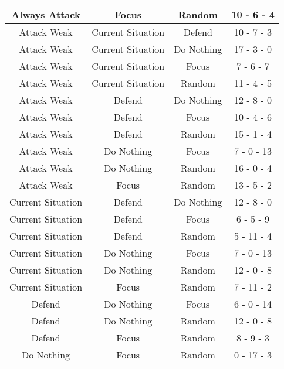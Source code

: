 \documentclass[11pt]{article}
\begin{document}
\begin{longtable}{|c|c|c|c|}
                \hline   Always Attack   &       Focus       &      Random       & 10 - 6 - 4  \\
                \hline    Attack Weak    & Current Situation &      Defend       & 10 - 7 - 3  \\
                \hline    Attack Weak    & Current Situation &    Do Nothing     & 17 - 3 - 0  \\
                \hline    Attack Weak    & Current Situation &       Focus       &  7 - 6 - 7  \\
                \hline    Attack Weak    & Current Situation &      Random       & 11 - 4 - 5  \\
                \hline    Attack Weak    &      Defend       &    Do Nothing     & 12 - 8 - 0  \\
                \hline    Attack Weak    &      Defend       &       Focus       & 10 - 4 - 6  \\
                \hline    Attack Weak    &      Defend       &      Random       & 15 - 1 - 4  \\
                \hline    Attack Weak    &    Do Nothing     &       Focus       & 7 - 0 - 13  \\
                \hline    Attack Weak    &    Do Nothing     &      Random       & 16 - 0 - 4  \\
                \hline    Attack Weak    &       Focus       &      Random       & 13 - 5 - 2  \\
                \hline Current Situation &      Defend       &    Do Nothing     & 12 - 8 - 0  \\
                \hline Current Situation &      Defend       &       Focus       &  6 - 5 - 9  \\
                \hline Current Situation &      Defend       &      Random       & 5 - 11 - 4  \\
                \hline Current Situation &    Do Nothing     &       Focus       & 7 - 0 - 13  \\
                \hline Current Situation &    Do Nothing     &      Random       & 12 - 0 - 8  \\
                \hline Current Situation &       Focus       &      Random       & 7 - 11 - 2  \\
                \hline      Defend       &    Do Nothing     &       Focus       & 6 - 0 - 14  \\
                \hline      Defend       &    Do Nothing     &      Random       & 12 - 0 - 8  \\
                \hline      Defend       &       Focus       &      Random       &  8 - 9 - 3  \\
                \hline    Do Nothing     &       Focus       &      Random       & 0 - 17 - 3  \\
                \hline
            \end{longtable}
\end{document}
